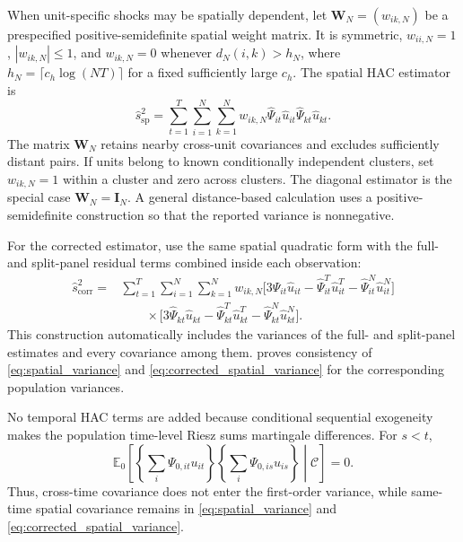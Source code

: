 \documentclass[11pt]{article}
\numberwithin{equation}{section}
\theoremstyle{remark}
\newcommand{\Ezero}{\mathbb E_0}
\begin{document}
When unit-specific shocks may be spatially dependent, let $\bm W_N=(w_{ik,N})$ be a prespecified positive-semidefinite spatial weight matrix. It is symmetric, $w_{ii,N}=1$, $|w_{ik,N}|\le1$, and $w_{ik,N}=0$ whenever $d_N(i,k)>h_N$, where $h_N=\lceil c_h\log(NT)\rceil$ for a fixed sufficiently large $c_h$. The spatial HAC estimator is
\begin{equation}
\label{eq:spatial_variance}
\widehat s_{\mathrm{sp}}^2
=
\sum_{t=1}^{T}\sum_{i=1}^{N}\sum_{k=1}^{N}
w_{ik,N}
\widehat\Psi_{it}\widehat u_{it}
\widehat\Psi_{kt}\widehat u_{kt}.
\end{equation}
The matrix $\bm W_N$ retains nearby cross-unit covariances and excludes sufficiently distant pairs. If units belong to known conditionally independent clusters, set $w_{ik,N}=1$ within a cluster and zero across clusters. The diagonal estimator is the special case $\bm W_N=\bm I_N$. A general distance-based calculation uses a positive-semidefinite construction so that the reported variance is nonnegative.

For the corrected estimator, use the same spatial quadratic form with the full- and split-panel residual terms combined inside each observation:
\begin{align}
\widehat s_{\mathrm{corr}}^2
={}&
\sum_{t=1}^{T}\sum_{i=1}^{N}\sum_{k=1}^{N}
w_{ik,N}
\Big[
3\widehat\Psi_{it}\widehat u_{it}
-\widehat\Psi_{it}^{T}\widehat u_{it}^{T}
-\widehat\Psi_{it}^{N}\widehat u_{it}^{N}
\Big]
\nonumber\\
&\qquad\times
\Big[
3\widehat\Psi_{kt}\widehat u_{kt}
-\widehat\Psi_{kt}^{T}\widehat u_{kt}^{T}
-\widehat\Psi_{kt}^{N}\widehat u_{kt}^{N}
\Big].
\label{eq:corrected_spatial_variance}
\end{align}
This construction automatically includes the variances of the full- and split-panel estimates and every covariance among them.  proves consistency of \eqref{eq:spatial_variance} and \eqref{eq:corrected_spatial_variance} for the corresponding population variances.

No temporal HAC terms are added because conditional sequential exogeneity makes the population time-level Riesz sums martingale differences. For $s<t$,
$$
\Ezero\!\left[
\left\{\sum_i\Psi_{0,it}u_{it}\right\}
\left\{\sum_i\Psi_{0,is}u_{is}\right\}
\middle|\mathscr C
\right]
=0.
$$
Thus, cross-time covariance does not enter the first-order variance, while same-time spatial covariance remains in \eqref{eq:spatial_variance} and \eqref{eq:corrected_spatial_variance}.
\end{document}
